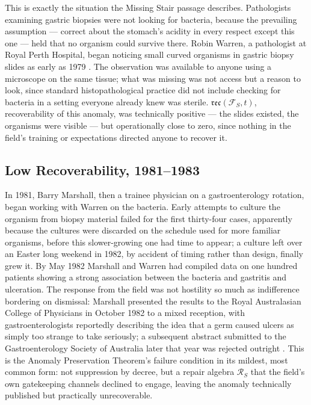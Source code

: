 \documentclass[12pt,twoside,openright]{book}
\newcommand{\reco}{\mathfrak{rec}}
\begin{document}
This is exactly the situation the Missing Stair passage
describes. Pathologists examining gastric biopsies were not
looking for bacteria, because the prevailing assumption --- correct
about the stomach's acidity in every respect except this one ---
held that no organism could survive there. Robin Warren, a
pathologist at Royal Perth Hospital, began noticing small curved
organisms in gastric biopsy slides as early as 1979
\parencite{kyle2016}. The
observation was available to anyone using a microscope on the
same tissue; what was missing was not access but a reason to look,
since standard histopathological practice did not include
checking for bacteria in a setting everyone already knew was
sterile. $\reco(\mathcal{F}_S, t)$, recoverability of this
anomaly, was technically positive --- the slides existed, the
organisms were visible --- but operationally close to zero, since
nothing in the field's training or expectations directed anyone
to recover it.

\subsection{Low Recoverability, 1981--1983}

In 1981, Barry Marshall, then a trainee physician on a
gastroenterology rotation, began working with Warren on the
bacteria. Early attempts to culture the organism from biopsy
material failed for the first thirty-four cases, apparently
because the cultures were discarded on the schedule used for more
familiar organisms, before this slower-growing one had time to
appear; a culture left over an Easter long weekend in 1982, by
accident of timing rather than design, finally grew it. By May
1982 Marshall and Warren had compiled data on one hundred
patients showing a strong association between the bacteria and
gastritis and ulceration. The response from the field was not
hostility so much as indifference bordering on dismissal: Marshall
presented the results to the Royal Australasian College of
Physicians in October 1982 to a mixed reception, with
gastroenterologists reportedly describing the idea that a germ
caused ulcers as simply too strange to take seriously; a
subsequent abstract submitted to the Gastroenterology Society of
Australia later that year was rejected outright
\parencite{kyle2016}. This is the
Anomaly Preservation Theorem's failure condition in its mildest,
most common form: not suppression by decree, but a repair
algebra $\mathcal{R}_S$ that the field's own gatekeeping channels
declined to engage, leaving the anomaly technically published but
practically unrecoverable.
\end{document}
